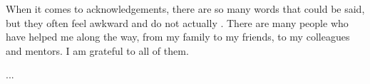\begin{acknowledgements}
    When it comes to acknowledgements, there are so many words that could be said, but they often feel awkward and do not actually . There are many people who have helped me along the way, from my family to my friends, to my colleagues and mentors. I am grateful to all of them. 

    ... 
    


\end{acknowledgements}

